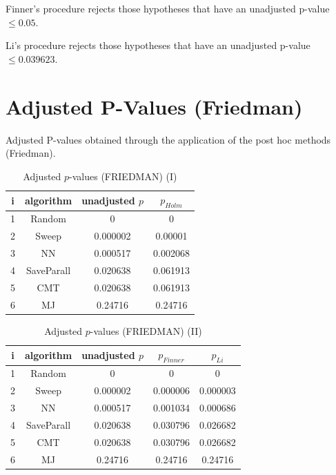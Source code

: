 \documentclass[a4paper,10pt]{article}
\begin{document}
\begin{landscape}
Finner's procedure rejects those hypotheses that have an unadjusted p-value $\le0.05$.

Li's procedure rejects those hypotheses that have an unadjusted p-value $\le0.039623$.


\newpage

\section{Adjusted P-Values (Friedman)}


Adjusted P-values obtained through the application of the post hoc methods (Friedman).

\begin{table}[!htp]
\centering\small
\begin{tabular}{cccc}
i&algorithm&unadjusted $p$&$p_{Holm}$\\
\hline1&Random&0&0\\2&Sweep&0.000002&0.00001\\3&NN&0.000517&0.002068\\4&SaveParall&0.020638&0.061913\\5&CMT&0.020638&0.061913\\6&MJ&0.24716&0.24716\\\hline
\end{tabular}
\caption{Adjusted $p$-values (FRIEDMAN) (I)}
\end{table}
\begin{table}[!htp]
\centering\small
\begin{tabular}{ccccc}
i&algorithm&unadjusted $p$&$p_{Finner}$&$p_{Li}$\\
\hline1&Random&0&0&0\\2&Sweep&0.000002&0.000006&0.000003\\3&NN&0.000517&0.001034&0.000686\\4&SaveParall&0.020638&0.030796&0.026682\\5&CMT&0.020638&0.030796&0.026682\\6&MJ&0.24716&0.24716&0.24716\\\hline
\end{tabular}
\caption{Adjusted $p$-values (FRIEDMAN) (II)}
\end{table}

\newpage
\end{landscape}
\end{document}
